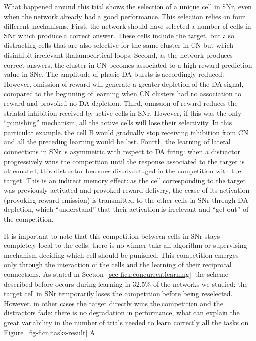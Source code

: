 \documentclass[
  11pt,
  a4paper,
]{scrbook}
\begin{document}
What happened around this trial shows the selection of a unique cell in
SNr, even when the network already had a good performance. This
selection relies on four different mechanisms. First, the network should
have selected a number of cells in SNr which produce a correct answer.
These cells include the target, but also distracting cells that are also
selective for the same cluster in CN but which disinhibit irrelevant
thalamocortical loops. Second, as the network produces correct answers,
the cluster in CN becomes associated to a high reward-prediction value
in SNc. The amplitude of phasic DA bursts is accordingly reduced.
However, omission of reward will generate a greater depletion of the DA
signal, compared to the beginning of learning when CN clusters had no
association to reward and provoked no DA depletion. Third, omission of
reward reduces the striatal inhibition received by active cells in SNr.
However, if this was the only ``punishing'' mechanism, all the active
cells will lose their selectivity. In this particular example, the cell
B would gradually stop receiving inhibition from CN and all the
preceding learning would be lost. Fourth, the learning of lateral
connections in SNr is asymmetric with respect to DA firing: when a
distractor progressively wins the competition until the response
associated to the target is attenuated, this distractor becomes
disadvantaged in the competition with the target. This is an indirect
memory effect: as the cell corresponding to the target was previously
activated and provoked reward delivery, the cease of its activation
(provoking reward omission) is transmitted to the other cells in SNr
through DA depletion, which ``understand'' that their activation is
irrelevant and ``get out'' of the competition.

It is important to note that this competition between cells in SNr stays
completely local to the cells: there is no winner-take-all algorithm or
supervising mechanism deciding which cell should be punished. This
competition emerges only through the interaction of the cells and the
learning of their reciprocal connections. As stated in
Section~\ref{sec-ficn:concurrentlearning}, the scheme described before
occurs during learning in 32.5\% of the networks we studied: the target
cell in SNr temporarily loses the competition before being reselected.
However, in other cases the target directly wins the competition and the
distractors fade: there is no degradation in performance, what can
explain the great variability in the number of trials needed to learn
correctly all the tasks on Figure~\ref{fig-ficn:tasks-result} A.
\end{document}
